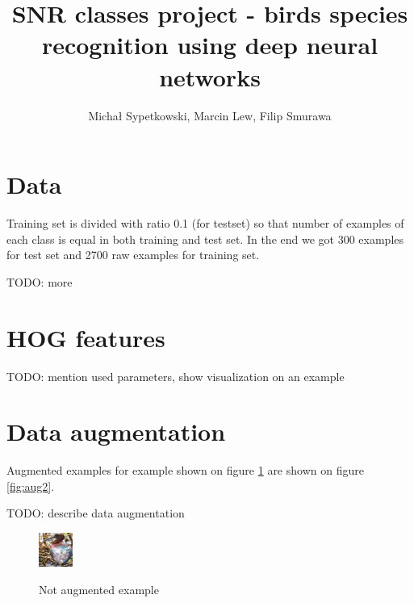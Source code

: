 \documentclass[a4paper]{article}
\begin{document}
\title{SNR classes project - birds species recognition using deep neural networks}

\author{Michał Sypetkowski, Marcin Lew, Filip Smurawa}
\maketitle

\section{Data}
Training set is divided with ratio 0.1 (for testset)
so that number of examples of each class is equal in both training and test set.
In the end we got 300 examples for test set and 2700 raw examples for training set.

TODO: more

\section{HOG features}
TODO: mention used parameters, show visualization on an example


\section{Data augmentation}
Augmented examples for example shown on figure \ref{fig:aug1}
are shown on figure \ref{fig:aug2}.

TODO: describe data augmentation

\begin{figure}[h]
    \caption[]{Not augmented example}
    \centering
    \includegraphics[page=2,width=0.1\textwidth]{aug1.png}
    \label{fig:aug1}
\end{figure}
\end{document}
